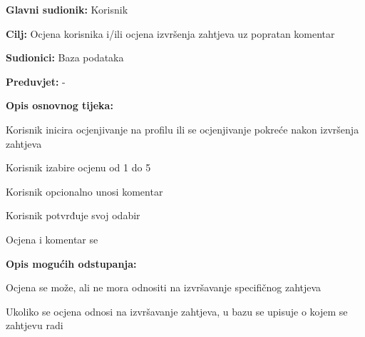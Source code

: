 				
					\noindent {}
					\begin{packed_item}
						
						\item \textbf{Glavni sudionik: }Korisnik
						\item  \textbf{Cilj:} Ocjena korisnika i/ili ocjena izvršenja zahtjeva uz popratan komentar 
						\item  \textbf{Sudionici:} Baza podataka
						\item  \textbf{Preduvjet:} -
						\item  \textbf{Opis osnovnog tijeka:}
						
						\item[] \begin{packed_enum}
							
							\item Korisnik inicira ocjenjivanje na profilu ili se ocjenjivanje pokreće nakon izvršenja zahtjeva
							\item Korisnik izabire ocjenu od 1 do 5
							\item Korisnik opcionalno unosi komentar
							\item Korisnik potvrđuje svoj odabir
							\item Ocjena i komentar se
						\end{packed_enum}
						
						\item  \textbf{Opis mogućih odstupanja:}
						
						\item[] \begin{packed_item}
							
							\item[2.a] Ocjena se može, ali ne mora odnositi na izvršavanje specifičnog zahtjeva
							\item[] \begin{packed_enum}
								
								\item Ukoliko se ocjena odnosi na izvršavanje zahtjeva, u bazu se upisuje o kojem se zahtjevu radi
								
							\end{packed_enum}
							
						\end{packed_item}
					\end{packed_item}
				
